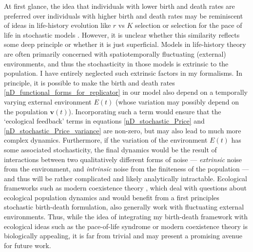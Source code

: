 At first glance, the idea that individuals with lower birth and death rates are preferred over individuals with higher birth and death rates may be reminiscent of ideas in life-history evolution like $r$ vs $K$ selection or selection for the pace of life in stochastic models  \citep{stearns_evolution_1977}. However, it is unclear whether this similarity reflects some deep principle or whether it is just superficial. Models in life-history theory are often primarily concerned with spatiotemporally fluctuating (external) environments, and thus the stochasticity in those models is extrinsic to the population. I have entirely neglected such extrinsic factors in my formalisms. In principle, it is possible to make the birth and death rates \ref{nD_functional_forms_for_replicator} in our model also depend on a temporally varying external environment $E(t)$ (whose variation may possibly depend on the population $\mathbf{v}(t)$). Incorporating such a term would ensure that the `ecological feedback' terms in equations \eqref{nD_stochastic_Price} and \eqref{nD_stochastic_Price_variance} are non-zero, but may also lead to much more complex dynamics. Furthermore, if the variation of the environment $E(t)$ has some associated stochasticity, the final dynamics would be the result of interactions between two qualitatively different forms of noise --- \emph{extrinsic} noise from the environment, and \emph{intrinsic} noise from the finiteness of the population --- and thus will be rather complicated and likely analytically intractable. Ecological frameworks such as modern coexistence theory \citep{chesson_multispecies_1994}, which deal with questions about ecological population dynamics and would benefit from a first principles stochastic birth-death formulation, also generally work with fluctuating external environments. Thus, while the idea of integrating my birth-death framework with ecological ideas such as the pace-of-life syndrome \citep{mathot_models_2018, wright_life-history_2019} or modern coexistence theory \citep{chesson_multispecies_1994, johnson_resolving_2022} is biologically appealing, it is far from trivial and may present a promising avenue for future work.
